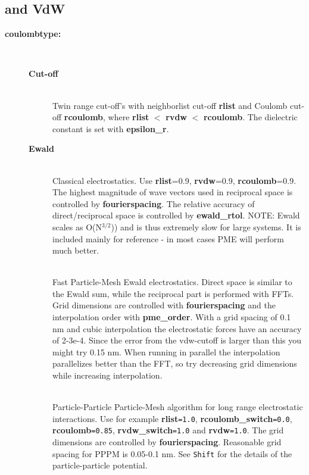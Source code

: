 \subsection{ and VdW}
\begin{description}
\item[{\bf coulombtype:}]\mbox{}\\
\vspace{-2ex}\begin{description}
\item[{\bf Cut-off}]\mbox{}\\
Twin range cut-off's with neighborlist cut-off {\bf rlist} and 
Coulomb cut-off {\bf rcoulomb},
where {\bf rlist} {\tt $<$} {\bf rvdw} {\tt $<$} {\bf rcoulomb}.
The dielectric constant is set with {\bf epsilon\_r}.
\item[{\bf Ewald}]\mbox{}\\
Classical  electrostatics.
Use {\eg} {\bf rlist}=0.9,
{\bf rvdw}=0.9, {\bf rcoulomb}=0.9. The highest magnitude of
wave vectors used in reciprocal space is controlled by {\bf fourierspacing}.
The relative accuracy of direct/reciprocal space
is controlled by {\bf ewald\_rtol}. NOTE: Ewald scales as O(N$^{3/2}$)) and
is thus extremely slow for large systems. It is included mainly for
reference - in most cases PME will perform much better.
\item[ ]\mbox{}\\
Fast Particle-Mesh Ewald electrostatics. Direct space is similar
to the Ewald sum, while the reciprocal part is performed with
FFTs. Grid dimensions are controlled with {\bf fourierspacing} and the
interpolation order with {\bf pme\_order}. With a grid spacing of 0.1
nm and cubic interpolation the electrostatic forces have an accuracy
of 2-3e-4. Since the error from the vdw-cutoff is larger than this you
might try 0.15 nm. When running in parallel the interpolation
parallelizes better than the FFT, so try decreasing grid dimensions
while increasing interpolation.
\item[]\mbox{}\\
Particle-Particle Particle-Mesh algorithm for long range
electrostatic interactions.
Use for example {\bf rlist}{\tt =1.0}, {\bf rcoulomb\_switch}{\tt =0.0},
{\bf rcoulomb}{\tt =0.85}, {\bf rvdw\_switch}{\tt =1.0}
and {\bf rvdw}{\tt =1.0}. The grid
dimensions are controlled by {\bf fourierspacing}.
Reasonable grid spacing for PPPM is 0.05-0.1 nm.
See {\tt Shift} for the details of the particle-particle potential.

\end{description}
\end{description}
